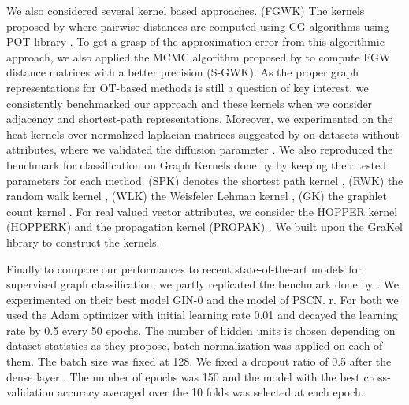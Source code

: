 \documentclass{article}
\begin{document}
	
	We also considered several kernel based approaches. (FGWK) The kernels  proposed by \citep{vayer-fused-2018}  where pairwise distances are computed using CG algorithms using POT library \citep{flamary2017pot}. To get a grasp of the approximation error from this algorithmic approach, we also applied the MCMC algorithm proposed by  \citep{chowdhury-generalized-2020} to compute FGW distance matrices with a better precision (S-GWK). As the proper graph representations for OT-based methods is still a question of key interest, we consistently benchmarked our approach and these kernels when we consider adjacency and shortest-path representations. Moreover, we experimented on the heat kernels over normalized laplacian matrices suggested by \citep{chowdhury-generalized-2020} on datasets without attributes, where we validated the diffusion parameter . We also reproduced the benchmark
	for classification on Graph Kernels done by \citep{vayer-fused-2018} by keeping their tested parameters for each method. (SPK)
	denotes the shortest path kernel \citep{borgwardt2005shortest}, (RWK) the
	random walk kernel \citep{gartner2003graph}, (WLK) the Weisfeler Lehman kernel
	\citep{vishwanathan2010graph}, (GK) the graphlet count kernel
	\citep{shervashidze09}. For real valued vector attributes, we
	consider the HOPPER kernel (HOPPERK) \citep{feragen2013scalable} and the
	propagation kernel (PROPAK) \citep{neumann2016propagation} . We built upon the
	GraKel library \citep{siglidis2020grakel}  to construct the kernels. 
	
	Finally to compare our performances to recent state-of-the-art models for supervised graph classification, we partly replicated the benchmark done by \citep{xu2018powerful}. We experimented on their best model GIN-0 and the model of \citep{niepert-learning-2016} PSCN. r. For both we used the Adam optimizer \citep{kingma2014adam} with initial learning rate 0.01 and decayed the learning rate by 0.5 every 50 epochs. The number of hidden units is chosen depending on dataset statistics as they propose, batch normalization \citep{ioffe2015batch} was applied on each of them. The batch size was fixed at 128. We fixed a dropout ratio of 0.5 after the dense layer \citep{srivastava2014dropout}. The number of epochs was 150 and the model with the best cross-validation accuracy averaged over the 10 folds was selected at each epoch.
	
\end{document}
